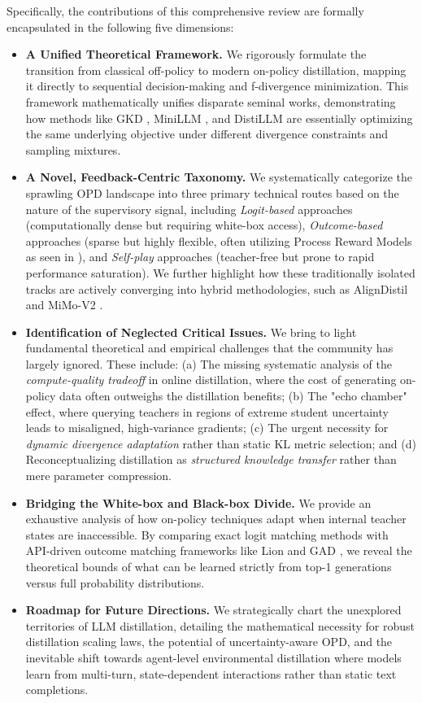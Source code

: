 \documentclass{article} %
\begin{document}
Specifically, the contributions of this comprehensive review are formally encapsulated in the following five dimensions:
\begin{itemize}
    \item \textbf{A Unified Theoretical Framework.} We rigorously formulate the transition from classical off-policy to modern on-policy distillation, mapping it directly to sequential decision-making and f-divergence minimization. This framework mathematically unifies disparate seminal works, demonstrating how methods like GKD \citep{2306.13649}, MiniLLM \citep{2306.08543}, and DistiLLM \citep{2402.03898} are essentially optimizing the same underlying objective under different divergence constraints and sampling mixtures.
    \item \textbf{A Novel, Feedback-Centric Taxonomy.} We systematically categorize the sprawling OPD landscape into three primary technical routes based on the nature of the supervisory signal, including \textit{Logit-based} approaches (computationally dense but requiring white-box access), \textit{Outcome-based} approaches (sparse but highly flexible, often utilizing Process Reward Models as seen in \citet{2305.20050}), and \textit{Self-play} approaches (teacher-free but prone to rapid performance saturation). We further highlight how these traditionally isolated tracks are actively converging into hybrid methodologies, such as AlignDistil \citep{2503.02832} and MiMo-V2 \citep{2601.02780}.
    \item \textbf{Identification of Neglected Critical Issues.} We bring to light fundamental theoretical and empirical challenges that the community has largely ignored. These include: (a) The missing systematic analysis of the \textit{compute-quality tradeoff} in online distillation, where the cost of generating on-policy data often outweighs the distillation benefits; (b) The "echo chamber" effect, where querying teachers in regions of extreme student uncertainty leads to misaligned, high-variance gradients; (c) The urgent necessity for \textit{dynamic divergence adaptation} rather than static KL metric selection; and (d) Reconceptualizing distillation as \textit{structured knowledge transfer} rather than mere parameter compression.
    \item \textbf{Bridging the White-box and Black-box Divide.} We provide an exhaustive analysis of how on-policy techniques adapt when internal teacher states are inaccessible. By comparing exact logit matching methods with API-driven outcome matching frameworks like Lion \citep{2310.01382} and GAD \citep{2511.10643}, we reveal the theoretical bounds of what can be learned strictly from top-1 generations versus full probability distributions.
    \item \textbf{Roadmap for Future Directions.} We strategically chart the unexplored territories of LLM distillation, detailing the mathematical necessity for robust distillation scaling laws, the potential of uncertainty-aware OPD, and the inevitable shift towards agent-level environmental distillation where models learn from multi-turn, state-dependent interactions rather than static text completions.
\end{itemize}
\end{document}

